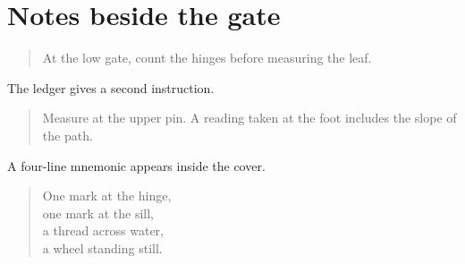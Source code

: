 \documentclass{article}
\begin{document}
\section*{Notes beside the gate}

\begin{quote}At the low gate, count the hinges before measuring the leaf.\end{quote}
The ledger gives a second instruction.
\begin{quotation}Measure at the upper pin. A reading taken at the foot includes the slope of the path.\end{quotation}
A four-line mnemonic appears inside the cover.
\begin{verse}One mark at the hinge,\\one mark at the sill,\\a thread across water,\\a wheel standing still.\end{verse}
\end{document}
